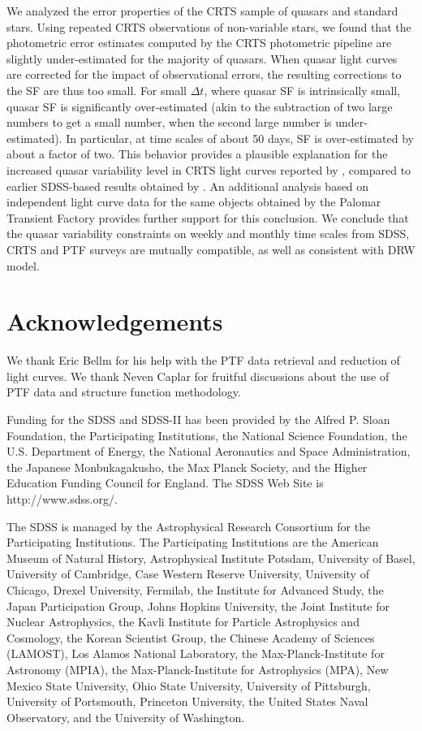 \documentclass[fleqn,usenatbib]{mnras}
\begin{document}
We analyzed the error properties of the CRTS sample of quasars and standard stars. Using 
repeated CRTS observations of non-variable stars, we found that the photometric error estimates 
computed by the CRTS photometric pipeline are slightly under-estimated for the majority of
quasars. When quasar light curves are corrected for the impact of observational errors, the
resulting corrections to the SF are thus too small. For small $\Delta t$, where quasar SF is intrinsically 
small, quasar SF is significantly over-estimated (akin to the subtraction of two large numbers 
to get a small number, when the second large number is under-estimated). In particular, at time
scales of about 50 days, SF is over-estimated by about a factor of two. This behavior provides 
a plausible explanation for the increased quasar variability level in CRTS light curves reported 
by \cite{graham2014}, compared to earlier SDSS-based results obtained by \cite{macleod2010}.
An additional analysis based on independent light curve data for the same objects obtained by 
the Palomar Transient Factory provides further support for this conclusion. We conclude that
the quasar variability constraints on weekly and monthly time scales from SDSS, CRTS and PTF 
surveys are mutually compatible, as well as consistent with DRW model. 



\section*{Acknowledgements}

We thank Eric Bellm for his help with the PTF data retrieval and reduction of light curves.  
We thank Neven Caplar for fruitful discussions about the use of PTF data and structure 
function methodology. 

Funding for the SDSS and SDSS-II has been provided by the Alfred P. Sloan Foundation, 
the Participating Institutions, the National Science Foundation, the U.S. Department of 
Energy, the National Aeronautics and Space Administration, the Japanese Monbukagakusho,
the Max Planck Society, and the Higher Education Funding Council for England. The SDSS 
Web Site is http://www.sdss.org/.

The SDSS is managed by the Astrophysical Research Consortium for the Participating Institutions. 
The Participating Institutions are the American Museum of Natural History, Astrophysical Institute 
Potsdam, University of Basel, University of Cambridge, Case Western Reserve University, University
of Chicago, Drexel University, Fermilab, the Institute for Advanced Study, the Japan Participation 
Group, Johns Hopkins University, the Joint Institute for Nuclear Astrophysics, the Kavli Institute for 
Particle Astrophysics and Cosmology, the Korean Scientist Group, the Chinese Academy of Sciences 
(LAMOST), Los Alamos National Laboratory, the Max-Planck-Institute for Astronomy (MPIA), the 
Max-Planck-Institute for Astrophysics (MPA), New Mexico State University, Ohio State University, 
University of Pittsburgh, University of Portsmouth, Princeton University, the United States Naval
Observatory, and the University of Washington. 
\end{document}
